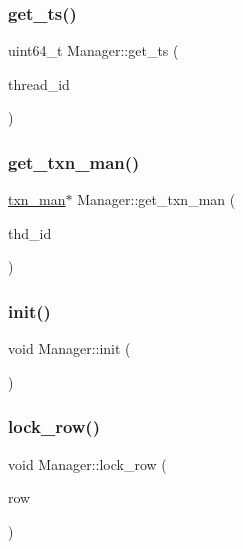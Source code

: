 \mbox{\label{classManager_a61c4d259fc2e68dd0f0687956b873f06}} 
\subsubsection{\texorpdfstring{get\+\_\+ts()}{get\_ts()}}
{\footnotesize\ttfamily uint64\+\_\+t Manager\+::get\+\_\+ts (\begin{DoxyParamCaption}\item[{uint64\+\_\+t}]{thread\+\_\+id }\end{DoxyParamCaption})}

\mbox{\label{classManager_acf3a85553d0879190c6a8293bf475e8f}} 
\subsubsection{\texorpdfstring{get\+\_\+txn\+\_\+man()}{get\_txn\_man()}}
{\footnotesize\ttfamily \hyperlink{classtxn__man}{txn\+\_\+man}$\ast$ Manager\+::get\+\_\+txn\+\_\+man (\begin{DoxyParamCaption}\item[{int}]{thd\+\_\+id }\end{DoxyParamCaption})\hspace{0.3cm}{\ttfamily [inline]}}

\mbox{\label{classManager_a5e70b531d3af13c1a6af84dcc84fa225}} 
\subsubsection{\texorpdfstring{init()}{init()}}
{\footnotesize\ttfamily void Manager\+::init (\begin{DoxyParamCaption}{ }\end{DoxyParamCaption})}

\mbox{\label{classManager_a3e78aa1d124adce621968849bf780525}} 
\subsubsection{\texorpdfstring{lock\+\_\+row()}{lock\_row()}}
{\footnotesize\ttfamily void Manager\+::lock\+\_\+row (\begin{DoxyParamCaption}\item[{\hyperlink{classrow__t}{row\+\_\+t} $\ast$}]{row }\end{DoxyParamCaption})}


